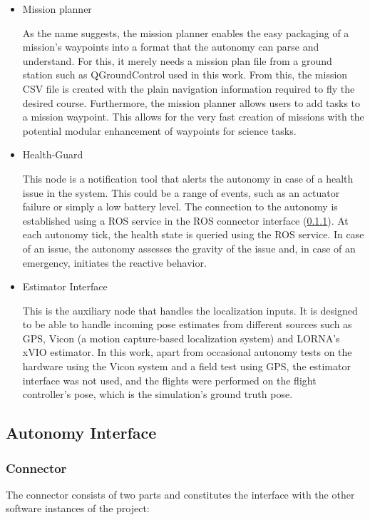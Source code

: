 \begin{itemize}
    \item Mission planner

    As the name suggests, the mission planner enables the easy packaging of a mission's waypoints into a format that the autonomy can parse and understand. For this, it merely needs a mission plan file from a ground station such as QGroundControl used in this work. From this, the mission CSV file is created with the plain navigation information required to fly the desired course. Furthermore, the mission planner allows users to add tasks to a mission waypoint. This allows for the very fast creation of missions with the potential modular enhancement of waypoints for science tasks.
    \item Health-Guard
    
    This node is a notification tool that alerts the autonomy in case of a health issue in the system. This could be a range of events, such as an actuator failure or simply a low battery level. The connection to the autonomy is established using a ROS service in the ROS connector interface (\ref{subsubsec:connector}). At each autonomy tick, the health state is queried using the ROS service. In case of an issue, the autonomy assesses the gravity of the issue and, in case of an emergency, initiates the reactive behavior.

    \item Estimator Interface
    
    This is the auxiliary node that handles the localization inputs. It is designed to be able to handle incoming pose estimates from different sources such as GPS, Vicon (a motion capture-based localization system) and LORNA's xVIO estimator. In this work, apart from occasional autonomy tests on the hardware using the Vicon system and a field test using GPS, the estimator interface was not used, and the flights were performed on the flight controller's pose, which is the simulation's ground truth pose.
\end{itemize}

\subsection{Autonomy Interface}
\subsubsection{Connector}\label{subsubsec:connector}

The connector consists of two parts and constitutes the interface with the other software instances of the project:

